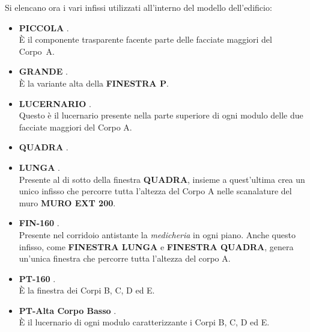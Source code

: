 Si elencano ora i vari infissi utilizzati all'interno del modello dell'edificio:
\begin{itemize}
	\item \textbf{PICCOLA} .\\ È il componente trasparente facente parte delle facciate maggiori del Corpo~A. 
	\item \textbf{GRANDE} .\\ È la variante alta della \textbf{FINESTRA P}. 
	\item \textbf{LUCERNARIO} .\\ Questo è il lucernario presente nella parte superiore di ogni modulo delle due facciate maggiori del Corpo A. 
	\item \textbf{QUADRA} .
	\item \textbf{LUNGA} .\\ Presente al di sotto della finestra \textbf{QUADRA}, insieme a quest'ultima crea un unico infisso che percorre tutta l'altezza del Corpo A nelle scanalature del muro \textbf{MURO EXT 200}. 
	\item \textbf{FIN-160} . \\ Presente nel corridoio antistante la \emph{medicheria} in ogni piano. Anche questo infisso, come \textbf{FINESTRA LUNGA} e \textbf{FINESTRA QUADRA}, genera un'unica finestra che percorre tutta l'altezza del corpo A.
	\item \textbf{PT-160} . \\ È la finestra dei Corpi B, C, D ed E. 
	\item \textbf{PT-Alta Corpo Basso} .\\ È il lucernario di ogni modulo caratterizzante i Corpi B, C, D ed E. 
\end{itemize}

